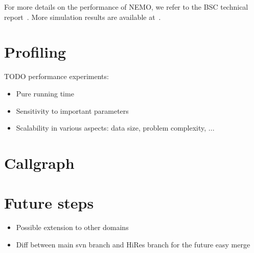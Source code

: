 For more details on the performance of NEMO, we refer to the BSC technical report~\cite{nemo-per15}. More simulation results are 
available at~\cite{ece-sim,prace12,TM673}.

\section{Profiling}

TODO performance experiments:
\begin{itemize}
  \item Pure running time
  \item Sensitivity to important parameters 
  \item Scalability in various aspects: data size, problem complexity, ... 
\end{itemize}
    
    
\section{Callgraph}

\section{Future steps}
\begin{itemize}
    \item Possible extension to other domains
    \item Diff between main svn branch and HiRes branch for the future easy merge
\end{itemize}



   
    